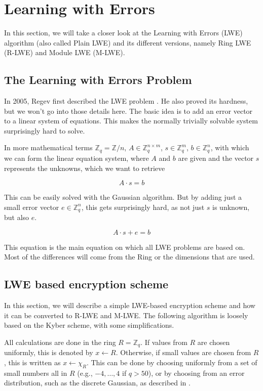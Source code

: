 \chapter{Learning with Errors}
\label{LWE}

In this section, we will take a closer look at the Learning with Errors (LWE) algorithm (also called Plain LWE) and its different versions, namely Ring LWE (R-LWE) and Module LWE (M-LWE).

\section{The Learning with Errors Problem}

In 2005, Regev first described the LWE problem \cite{Regev2005OnLL}. He also proved its hardness, but we won't go into those details here. The basic idea is to add an error vector to a linear system of equations. This makes the normally trivially solvable system surprisingly hard to solve.

In more mathematical terms $\mathbb{Z}_q = \mathbb{Z}/n$, $A \in \mathbb{Z}_q^{n \times m}$, $s \in \mathbb{Z}_q^m$, $b \in \mathbb{Z}_q^n$, with which we can form the linear equation system, where $A$ and $b$ are given and the vector $s$ represents the unknowns, which we want to retrieve

$$A\cdot s = b$$

This can be easily solved with the Gaussian algorithm. But by adding just a small error vector $e \in \mathbb{Z}_q^n$, this gets surprisingly hard, as not just $s$ is unknown, but also $e$.

$$
A \cdot s + e = b
$$

This equation is the main equation on which all LWE problems are based on. Most of the differences will come from the Ring or the dimensions that are used.

\section{LWE based encryption scheme}

In this section, we will describe a simple LWE-based encryption scheme and how it can be converted to R-LWE and M-LWE. The following algorithm is loosely based on the Kyber \cite{CyrstalsKyber} scheme, with some simplifications.

All calculations are done in the ring $R = \mathbb{Z}_q$. If values from $R$ are chosen uniformly, this is denoted by $x \leftarrow R$. Otherwise, if small values are chosen from $R$, this is written as $x \leftarrow \chi_R$. This can be done by choosing uniformly from a set of small numbers all in $R$ (e.g., ${-4,\ldots, 4}$ if $q>50$), or by choosing from an error distribution, such as the discrete Gaussian, as described in \cite{Regev2005OnLL}.

